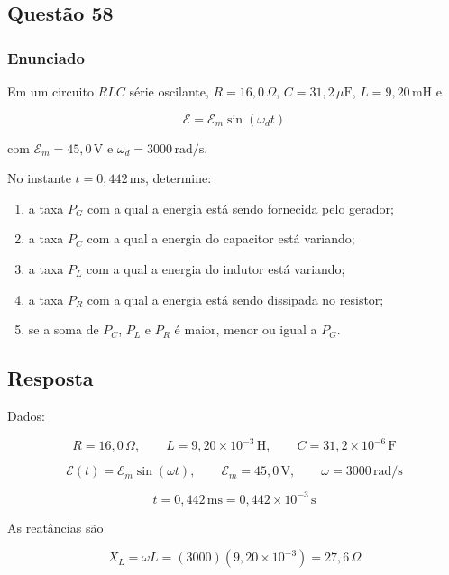 \subsection{Questão 58}

\subsubsection{Enunciado}

Em um circuito \(RLC\) série oscilante, \(R = 16{,}0\,\Omega\), 
\(C = 31{,}2\,\mu\text{F}\), \(L = 9{,}20\,\text{mH}\) e

\[
\mathcal{E} = \mathcal{E}_m \sin(\omega_d t)
\]

com \(\mathcal{E}_m = 45{,}0\,\text{V}\) e 
\(\omega_d = 3000\,\text{rad/s}\).

No instante \(t = 0{,}442\,\text{ms}\), determine:

\begin{enumerate}
    \item[(a)] a taxa \(P_G\) com a qual a energia está sendo fornecida pelo gerador;

    \item[(b)] a taxa \(P_C\) com a qual a energia do capacitor está variando;

    \item[(c)] a taxa \(P_L\) com a qual a energia do indutor está variando;

    \item[(d)] a taxa \(P_R\) com a qual a energia está sendo dissipada no resistor;

    \item[(e)] se a soma de \(P_C\), \(P_L\) e \(P_R\) é maior, menor ou igual a \(P_G\).
\end{enumerate}

\subsection*{Resposta}

Dados:

\[
R = 16,0\,\Omega,
\qquad
L = 9,20\times10^{-3}\,\text{H},
\qquad
C = 31,2\times10^{-6}\,\text{F}
\]

\[
\mathcal{E}(t)=\mathcal{E}_m\sin(\omega t),
\qquad
\mathcal{E}_m=45,0\,\text{V},
\qquad
\omega=3000\,\text{rad/s}
\]

\[
t=0,442\,\text{ms}
=0,442\times10^{-3}\,\text{s}
\]

As reatâncias são

\[
X_L=\omega L
=(3000)(9,20\times10^{-3})
=27,6\,\Omega
\]

